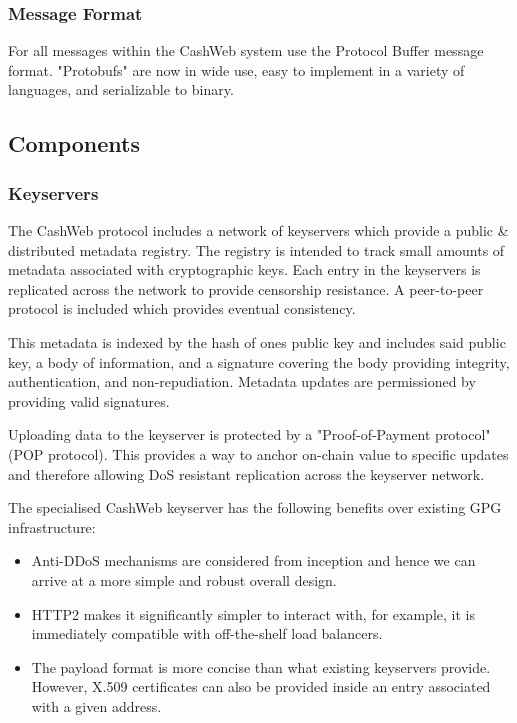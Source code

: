\documentclass{article}
\begin{document}
\subsubsection{Message Format}

For all messages within the CashWeb system use the Protocol Buffer message format. "Protobufs" are now in wide use, easy to implement in a variety of languages, and serializable to binary.

\subsection{Components}

\subsubsection{Keyservers}

The CashWeb protocol includes a network of keyservers which provide a public \& distributed metadata registry. The registry is intended to track small amounts of metadata associated with cryptographic keys. Each entry in the keyservers is replicated across the network to provide censorship resistance. A peer-to-peer protocol is included which provides eventual consistency.

This metadata is indexed by the hash of ones public key and includes said public key, a body of information, and a signature covering the body providing integrity, authentication, and non-repudiation. Metadata updates are permissioned by providing valid signatures.

Uploading data to the keyserver is protected by a "Proof-of-Payment protocol" (POP protocol). This provides a way to anchor on-chain value to specific updates and therefore allowing DoS resistant replication across the keyserver network.

The specialised CashWeb keyserver has the following benefits over existing GPG infrastructure:
\begin{itemize}
  \item Anti-DDoS mechanisms are considered from inception and hence we can arrive at a more simple and robust overall design.
  \item HTTP2 makes it significantly simpler to interact with, for example, it is immediately compatible with off-the-shelf load balancers.
  \item The payload format is more concise than what existing keyservers provide. However, X.509 certificates can also be provided inside an entry associated with a given address.
\end{itemize}
\end{document}
